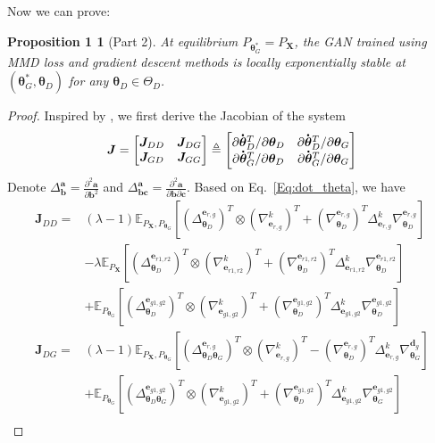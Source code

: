\documentclass{article} %
\theoremstyle{plain}
\newtheorem*{proposition 1*}{Proposition 1}
\newcommand{\set}[1]{\mathbb{#1}}  %
\newcommand{\rdv}[1]{\mathbf{#1}}  %
\newcommand*{\dt}[1]{%
	\accentset{\mbox{\large\bfseries .}}{#1}}
\begin{document}
\begin{appendices}
Now we can prove:
\begin{proposition 1*}[Part 2]
	At equilibrium \(P_{\bm{\theta}_G^*}=P_{\rdv{X}}\), the GAN trained using MMD loss and gradient descent methods is locally exponentially stable at \((\bm{\theta}_G^*,\bm{\theta}_D)\) for any \(\bm{\theta}_D\in\Theta_D\).
\end{proposition 1*}
\begin{proof}
	Inspired by \cite{gan_stable}, we first derive the Jacobian of the system
	\[\bm{J}=
	\begin{bmatrix}
	\bm{J}_{DD} & \bm{J}_{DG} \\ \bm{J}_{GD} & \bm{J}_{GG}
	\end{bmatrix}\triangleq
	\begin{bmatrix}
	\partial\dt{\bm{\theta}}_D^T/\partial\bm{\theta}_D & \partial\dt{\bm{\theta}}_D^T/\partial\bm{\theta}_G \\ \partial\dt{\bm{\theta}}_G^T/\partial\bm{\theta}_D & \partial\dt{\bm{\theta}}_G^T/\partial\bm{\theta}_G
	\end{bmatrix}\]
	Denote \(\Delta_{\bm{b}}^{\bm{a}}=\frac{\partial^2\bm{a}}{\partial\bm{b}^2}\) and \(\Delta_{\bm{b}\bm{c}}^{\bm{a}}=\frac{\partial^2\bm{a}}{\partial\bm{b}\partial\bm{c}}\). Based on Eq.~\ref{Eq:dot_theta}, we have
	\begin{subequations}\label{Eq:Jacobian}
		\begin{align}
		\bm{J}_{DD} = 
		&(\lambda-1)\set{E}_{P_{\rdv{X}},P_{\bm{\theta}_G}}[(\Delta_{\bm{\theta}_D}^{\bm{e}_{r,g}})^T\otimes(\nabla_{\bm{e}_{r,g}}^k)^T+(\nabla_{\bm{\theta}_D}^{\bm{e}_{r,g}})^T\Delta_{\bm{e}_{r,g}}^k\nabla_{\bm{\theta}_D}^{\bm{e}_{r,g}}] \\
		&-\lambda\set{E}_{P_{\rdv{X}}}[(\Delta_{\bm{\theta}_D}^{\bm{e}_{r1,r2}})^T\otimes(\nabla_{\bm{e}_{r1,r2}}^k)^T+(\nabla_{\bm{\theta}_D}^{\bm{e}_{r1,r2}})^T\Delta_{\bm{e}_{r1,r2}}^k\nabla_{\bm{\theta}_D}^{\bm{e}_{r1,r2}}] \nonumber\\
		&+\set{E}_{P_{\bm{\theta}_G}}[(\Delta_{\bm{\theta}_D}^{\bm{e}_{g1,g2}})^T\otimes(\nabla_{\bm{e}_{g1,g2}}^k)^T+(\nabla_{\bm{\theta}_D}^{\bm{e}_{g1,g2}})^T\Delta_{\bm{e}_{g1,g2}}^k\nabla_{\bm{\theta}_D}^{\bm{e}_{g1,g2}}] \nonumber\\
		\bm{J}_{DG} = 
		&(\lambda-1)\set{E}_{P_{\rdv{X}},P_{\bm{\theta}_G}}[(\Delta_{\bm{\theta}_D\bm{\theta}_G}^{\bm{e}_{r,g}})^T\otimes(\nabla_{\bm{e}_{r,g}}^k)^T-(\nabla_{\bm{\theta}_D}^{\bm{e}_{r,g}})^T\Delta_{\bm{e}_{r,g}}^k\nabla_{\bm{\theta}_G}^{\bm{d}_{g}}] \nonumber\\ &+\set{E}_{P_{\bm{\theta}_G}}[(\Delta_{\bm{\theta}_D\bm{\theta}_G}^{\bm{e}_{g1,g2}})^T\otimes(\nabla_{\bm{e}_{g1,g2}}^k)^T+(\nabla_{\bm{\theta}_D}^{\bm{e}_{g1,g2}})^T\Delta_{\bm{e}_{g1,g2}}^k\nabla_{\bm{\theta}_G}^{\bm{e}_{g1,g2}}] \\

\end{align}
\end{subequations}
\end{proof}
\end{appendices}
\end{document}
